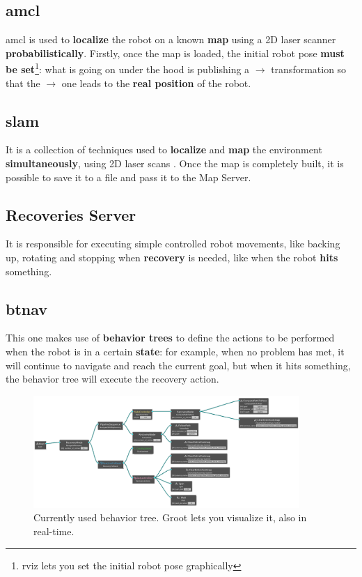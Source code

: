 \subsection{\acrfull{amcl}}

\acrshort{amcl} is used to \textbf{localize} the robot on a known \textbf{map} using a 2D laser scanner \textbf{probabilistically}. Firstly, once the map is loaded, the initial robot pose \textbf{must be set}\footnote{\acrshort{rviz} lets you set the initial robot pose graphically}: what is going on under the hood is publishing a  $\rightarrow$  transformation so that the  $\rightarrow$  one leads to the \textbf{real position} of the robot.

\subsection{\acrfull{slam}}

It is a collection of techniques used to \textbf{localize} and \textbf{map} the environment \textbf{simultaneously}, using 2D laser scans \cite{slam}. Once the map is completely built, it is possible to save it to a file and pass it to the Map Server.

\subsection{Recoveries Server}

It is responsible for executing simple controlled robot movements, like backing up, rotating and stopping when \textbf{recovery} is needed, like when the robot \textbf{hits} something.

\subsection{\acrfull{btnav}}

This one makes use of \textbf{behavior trees} to define the actions to be performed when the robot is in a certain \textbf{state}: for example, when no problem has met, it will continue to navigate and reach the current goal, but when it hits something, the behavior tree will execute the recovery action.

\begin{figure}[h]
    \centering
    \includegraphics[width=0.9\textwidth]{images/bt-alpha.png}
    \caption{Currently used behavior tree. Groot lets you visualize it, also in real-time. \cite{groot}}
\end{figure}

